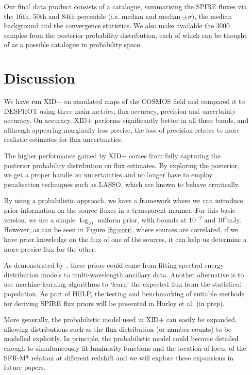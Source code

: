 \documentclass[useAMS,usenatbib]{mnras}
\begin{document}
Our final data product consists of a catalogue, summarising the SPIRE fluxes via the 16th, 50th and 84th percentile (i.e. median and median $\pm \sigma$), the median background and the convergence statistics. We also make available the 3000 samples from the posterior probability distribution, each of which can be thought of as a possible catalogue in probability space.

\section{Discussion}\label{sec:disc}
We have run \textsc{XID+} on simulated maps of the COSMOS field and compared it to \textsc{DESPHOT} using three main metrics; flux accuracy, precision and uncertainty accuracy. On accuracy, \textsc{XID+} performs significantly better in all three bands, and although appearing  marginally less precise, the loss of precision relates to more realistic estimates for flux uncertainties. 

The higher performance gained by \textsc{XID+} comes from fully capturing the posterior probability distribution on flux estimates. By exploring the posterior, we get a proper handle on uncertainties and no longer have to employ penalisation techniques such as LASSO, which are known to behave erratically.

By using a probabilistic approach, we have a framework where we can introduce prior information on the source fluxes in a transparent manner. For this basic version, we use a simple $\log_{10}$ uniform prior, with bounds at $10^{-2}$ and $10^{3}\mathrm{mJy}$. However, as can be seen in Figure \ref{fig:corr}, where sources are correlated, if we have prior knowledge on the flux of one of the sources, it can help us determine a more precise flux for the other.

As demonstrated by \cite{Safarzadeh:2015}, these priors could come from fitting spectral energy distribution models to multi-wavelength ancillary data. Another alternative is to use machine-learning algorithms to `learn' the expected flux from the statistical population. As part of HELP, the testing and benchmarking of suitable methods for deriving SPIRE flux priors will be presented in Hurley et al. (in prep). 

More generally, the probabilistic model used in \textsc{XID+} can easily be expanded, allowing distributions such as the flux distribution (or number counts) to be modelled explicitly. In principle, the probabilistic model could become detailed enough to simultaneously fit luminosity functions and the location of locus of the SFR-M* relation at different redshift and we will explore these expansions in future papers.
\end{document}
